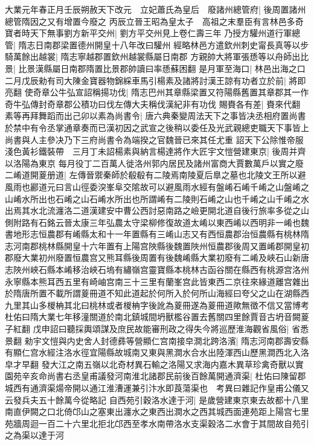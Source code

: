 大業元年春正月壬辰朔赦天下改元　立妃蕭氏為皇后　廢諸州總管府|{
	後周置諸州總管隋因之又有增置今廢之}
丙辰立晉王昭為皇太子　高祖之末羣臣有言林邑多奇寶者時天下無事劉方新平交州|{
	劉方平交州見上卷仁壽三年}
乃授方驩州道行軍總管|{
	隋志日南郡梁置德州開皇十八年改曰驩州}
經略林邑方遣欽州刺史甯長真等以步騎萬餘出越裳|{
	隋志寧越郡置欽州越裳縣屬日南郡}
方親帥大將軍張愻等以舟師出比景|{
	比景漢縣屬日南郡隋置比景郡帥讀曰率愻蘇困翻}
是月軍至海口|{
	林邑出海之口}
二月戊辰勑有司大陳金寶器物錦綵車馬引楊素及諸將討漢王諒有功者立於前|{
	將即亮翻}
使奇章公牛弘宣詔稱揚功伐|{
	隋志巴州其章縣梁置又符陽縣舊置其章郡其一作奇牛弘傳封奇章郡公積功曰伐左傳大夫稱伐漢紀非有功伐}
賜賚各有差|{
	賚來代翻}
素等再拜舞蹈而出己卯以素為尚書令|{
	唐六典秦變周法天下之事皆决丞相府置尚書於禁中有令丞掌通章奏而已漢初因之武宣之後稍以委任及光武親總吏職天下事皆上尚書與人主參决乃下三府尚書令為端揆之官魏晉已來其任尤重}
詔天下公除惟帝服淺色黃衫鐵裝帶　三月丁未詔楊素與納言楊達將作大匠宇文愷營建東京|{
	後周并齊以洛陽為東京}
每月役丁二百萬人徙洛州郭内居民及諸州富商大賈數萬戶以實之廢二崤道開葼册道|{
	左傳晉禦秦師於殽殽有二陵焉南陵夏后臯之墓也北陵文王所以避風雨也酈道元曰言山徑委湥峯阜交隂故可以避風雨水經有盤崤石崤千崤之山盤崤之山崤水所出也石崤之山石崤水所出也所謂崤有二陵則石崤之山也千崤之山千崤之水出焉其水北流瀍洛二道漢建安中曹公西討惡南路之嶮更開北道自後行旅率多從之山側附路有石銘云晉太康三年弘農太守梁柳修復故道太崤以東西崤以西明非一崤也魏書地形志恒農郡有崤縣太和十一年置縣有三崤山志又有西恒農郡治恒農縣有桃林隋志河南郡桃林縣開皇十六年置有上陽宫陜縣後魏置陜州恒農郡後周又置崤郡開皇初郡廢大業初州廢置恒農宫又熊耳縣後周置有後魏崤縣大業初廢有二崤及峽石山新唐志陜州峽石縣本崤移治峽石塢有繡嶺宫靈寶縣本桃林古函谷關在縣西有桃源宫洛州永寧縣本熊耳西五里有崎岫宫南三十三里有蘭峯宫此皆東西二京往來緣道離宫雜出於隋唐所置不載所謂葼冊道不知此道起於何所入於何所山海經曰夸父之山在湖縣西九里其山多椶柟其北曰桃林或者椶柟字後訛為葼冊遂為葼冊道歟無徵不信又當博考杜佑曰隋大業七年移潼關道於南北鎮城間坍獸檻谷置去舊關四里餘賈音古坍音闕葼子紅翻}
戊申詔曰聽採輿頌謀及庶民故能審刑政之得失今將巡歷淮海觀省風俗|{
	省悉景翻}
勑宇文愷與内史舍人封德彞等營顯仁宫南接皁澗北跨洛濱|{
	隋志河南郡壽安縣有顯仁宫水經注洛水徑宜陽縣故城南又東與黑澗水合水出陸渾西山歷黑澗西北入洛皁才早翻}
發大江之南五嶺以北奇材異石輸之洛陽又求海内嘉木異草珍禽奇獸以實園苑辛亥命尚書右丞皇甫議發河南淮北諸郡民前後百餘萬開通濟渠|{
	杜佑曰陳留郡城西有通濟渠煬帝開以通江淮漕運兼引汴水即莨蕩渠也　考異曰雜記作皇甫公儀又云發兵夫五十餘萬今從略記}
自西苑引穀洛水達于河|{
	是歲營建東京東去故都十八里南直伊闕之口北倚邙山之塞東出瀍水之東西出澗水之西其城西面連苑距上陽宫七里苑牆周迴一百二十六里北拒北邙西至孝水南帶洛水支渠穀洛二水會于其間故自苑引之為渠以達于河}
